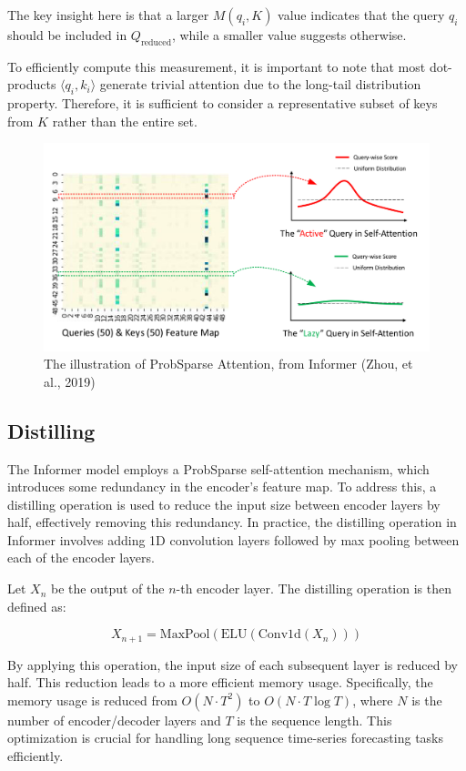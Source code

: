 The key insight here is that a larger \( M(q_i, K) \) value indicates that the query \( q_i \) should be included in \( Q_{\text{reduced}} \), while a smaller value suggests otherwise.

To efficiently compute this measurement, it is important to note that most dot-products \( \langle q_i, k_i \rangle \) generate trivial attention due to the long-tail distribution property. Therefore, it is sufficient to consider a representative subset of keys from \( K \) rather than the entire set.

\begin{figure}[htbp]
    \centering
    \includegraphics[width=12cm]{3_ChapterTranformerVariants/figuras/Queries_ProbSparceAttention.png}
    \caption{The illustration of ProbSparse Attention, from Informer (Zhou, et al., 2019)\cite{zhou2021informerefficienttransformerlong}}
    \end{figure}

\subsection{Distilling}
The Informer model employs a ProbSparse self-attention mechanism, which introduces some redundancy in the encoder’s feature map. To address this, a distilling operation is used to reduce the input size between encoder layers by half, effectively removing this redundancy. In practice, the distilling operation in Informer involves adding 1D convolution layers followed by max pooling between each of the encoder layers.

Let \( X_n \) be the output of the \( n \)-th encoder layer. The distilling operation is then defined as:

\[
X_{n+1} = \text{MaxPool}(\text{ELU}(\text{Conv1d}(X_n)))
\]

By applying this operation, the input size of each subsequent layer is reduced by half. This reduction leads to a more efficient memory usage. Specifically, the memory usage is reduced from \( O(N \cdot T^2) \) to \( O(N \cdot T \log T) \), where \( N \) is the number of encoder/decoder layers and \( T \) is the sequence length. This optimization is crucial for handling long sequence time-series forecasting tasks efficiently.



